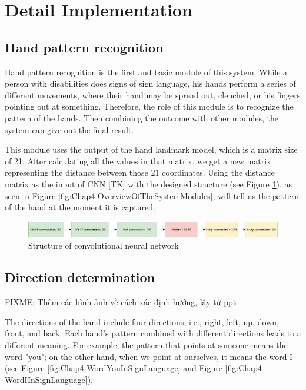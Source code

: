 \section{Detail Implementation}

\subsection{Hand pattern recognition}

Hand pattern recognition is the first and basic module of this system. While a person with disabilities does signs of sign language, his hands perform a series of different movements, where their hand may be spread out, clenched, or his fingers pointing out at something. Therefore, the role of this module is to recognize the pattern of the hands. Then combining the outcome with other modules, the system can give out the final result.

This module uses the output of the hand landmark model, which is a matrix size of 21. After calculating all the values in that matrix, we get a new matrix representing the distance between those 21 coordinates. Using the distance matrix as the input of CNN [TK] with the designed structure (see Figure \ref{fig:Chap4-StructureOfConvolutionalNeuralNetwork}), as seen in Figure \ref{fig:Chap4-OverviewOfTheSystemModules}, will tell us the pattern of the hand at the moment it is captured.

\begin{figure}[H]
  \centering
  \includegraphics[width=\textwidth]{img/Chap4/StructureOfConvolutionalNeuralNetwork.png}
  \caption{Structure of convolutional neural network}
  \label{fig:Chap4-StructureOfConvolutionalNeuralNetwork}
\end{figure}

\subsection{Direction determination}
FIXME: Thêm các hình ảnh về cách xác định hướng, lấy từ ppt

The directions of the hand include four directions, i.e., right, left, up, down, front, and back. Each hand's pattern combined with different directions leads to a different meaning. For example, the pattern that points at someone means the word "you"; on the other hand, when we point at ourselves, it means the word I (see Figure \ref{fig:Chap4-WordYouInSignLanguage} and Figure \ref{fig:Chap4-WordIInSignLanguage}).

